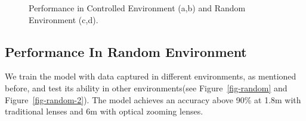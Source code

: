 \begin{figure}[!t]
    \centering
    \hfill
    \caption{Performance in Controlled Environment (a,b) and Random Environment (c,d).}
    \label{fig-performance-1}
\end{figure}


\subsection{Performance In Random Environment}
We train the model with data captured in different environments, as mentioned before, and test its ability in other environments(see Figure~\ref{fig-random} and Figure~\ref{fig-random-2}). The model achieves an accuracy above 90\% at 1.8m with traditional lenses and 6m with optical zooming lenses. 

